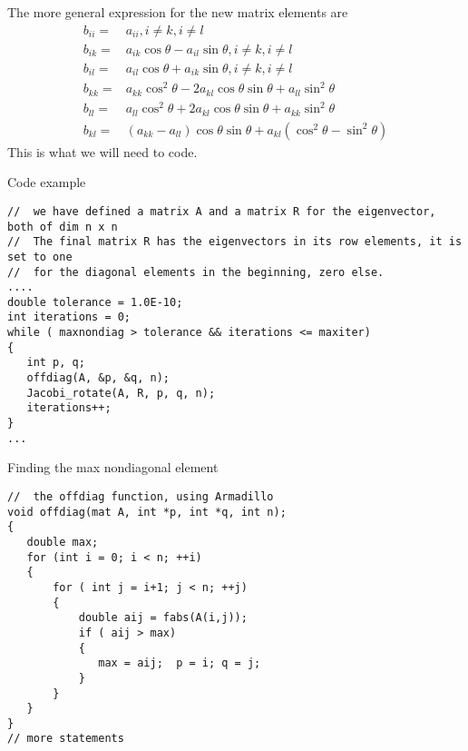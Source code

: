 \documentclass[%
oneside,                 %
final,                   %
10pt]{article}
\begin{document}
The more general expression for the new matrix elements are
\begin{align*}
b_{ii} =& a_{ii}, i \ne k, i \ne l \\
b_{ik} =& a_{ik}\cos\theta - a_{il}\sin\theta , i \ne k, i \ne l \\
b_{il} =& a_{il}\cos\theta + a_{ik}\sin\theta , i \ne k, i \ne l \nonumber\\
b_{kk} =& a_{kk}\cos^2\theta - 2a_{kl}\cos\theta \sin\theta +a_{ll}\sin^2\theta\nonumber\\
b_{ll} =& a_{ll}\cos^2\theta +2a_{kl}\cos\theta \sin\theta +a_{kk}\sin^2\theta\nonumber\\
b_{kl} =& (a_{kk}-a_{ll})\cos\theta \sin\theta +a_{kl}(\cos^2\theta-\sin^2\theta)\nonumber 
\end{align*}
This is what we will need to code.

 Code example















\begin{verbatim}
//  we have defined a matrix A and a matrix R for the eigenvector, both of dim n x n
//  The final matrix R has the eigenvectors in its row elements, it is set to one
//  for the diagonal elements in the beginning, zero else.
....
double tolerance = 1.0E-10; 
int iterations = 0;
while ( maxnondiag > tolerance && iterations <= maxiter)
{
   int p, q;
   offdiag(A, &p, &q, n);
   Jacobi_rotate(A, R, p, q, n);
   iterations++;
}
...

\end{verbatim}


Finding the max nondiagonal element


















\begin{verbatim}
//  the offdiag function, using Armadillo
void offdiag(mat A, int *p, int *q, int n);
{
   double max;
   for (int i = 0; i < n; ++i)
   {
       for ( int j = i+1; j < n; ++j)
       {
           double aij = fabs(A(i,j));
           if ( aij > max)
           { 
              max = aij;  p = i; q = j;
           }
       }
   }
}
// more statements

\end{verbatim}
\end{document}
